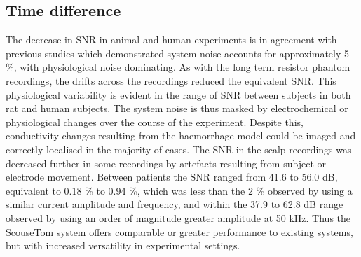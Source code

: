 \subsection{Time difference}
The decrease in SNR in animal and human experiments is in agreement with previous studies \cite{fabrizi2007analysis} which demonstrated system noise accounts for approximately 5 \%, with physiological noise dominating. As with the long term resistor phantom recordings, the drifts across the recordings reduced the equivalent SNR. This physiological variability is evident in the range of SNR between subjects in both rat and human subjects. The system noise is thus masked by electrochemical or physiological changes over the course of the experiment. Despite this, conductivity changes resulting from the haemorrhage model could be imaged and correctly localised in the majority of cases. The SNR in the scalp recordings was decreased further in some recordings by artefacts resulting from subject or electrode movement. Between patients the SNR ranged from 41.6 to 56.0 dB, equivalent to 0.18 \% to 0.94 \%, which was less than the 2 \% observed by \citet{Romsauerova2006} using a similar current amplitude and frequency, and within the 37.9 to 62.8 dB range observed by \citet{xu2011} using an order of magnitude greater amplitude at 50 kHz. Thus the ScouseTom system offers comparable or greater performance to existing systems, but with increased versatility in experimental settings. 